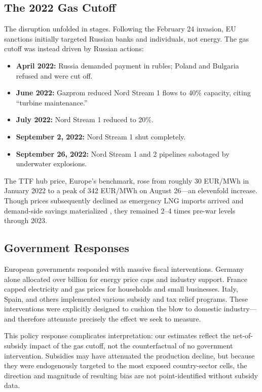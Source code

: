 \documentclass[12pt]{article}
\begin{document}
\subsection{The 2022 Gas Cutoff}

The disruption unfolded in stages. Following the February 24 invasion, EU sanctions initially targeted Russian banks and individuals, not energy. The gas cutoff was instead driven by Russian actions:

\begin{itemize}
\item \textbf{April 2022:} Russia demanded payment in rubles; Poland and Bulgaria refused and were cut off.
\item \textbf{June 2022:} Gazprom reduced Nord Stream 1 flows to 40\% capacity, citing ``turbine maintenance.''
\item \textbf{July 2022:} Nord Stream 1 reduced to 20\%.
\item \textbf{September 2, 2022:} Nord Stream 1 shut completely.
\item \textbf{September 26, 2022:} Nord Stream 1 and 2 pipelines sabotaged by underwater explosions.
\end{itemize}

The TTF hub price, Europe's benchmark, rose from roughly 30 EUR/MWh in January 2022 to a peak of 342 EUR/MWh on August 26---an elevenfold increase. Though prices subsequently declined as emergency LNG imports arrived and demand-side savings materialized \citep{ruhnau2023}, they remained 2--4 times pre-war levels through 2023.

\subsection{Government Responses}

European governments responded with massive fiscal interventions. Germany alone allocated over  billion for energy price caps and industry support. France capped electricity and gas prices for households and small businesses. Italy, Spain, and others implemented various subsidy and tax relief programs. These interventions were explicitly designed to cushion the blow to domestic industry---and therefore attenuate precisely the effect we seek to measure.

This policy response complicates interpretation: our estimates reflect the net-of-subsidy impact of the gas cutoff, not the counterfactual of no government intervention. Subsidies may have attenuated the production decline, but because they were endogenously targeted to the most exposed country-sector cells, the direction and magnitude of resulting bias are not point-identified without subsidy data.
\end{document}
